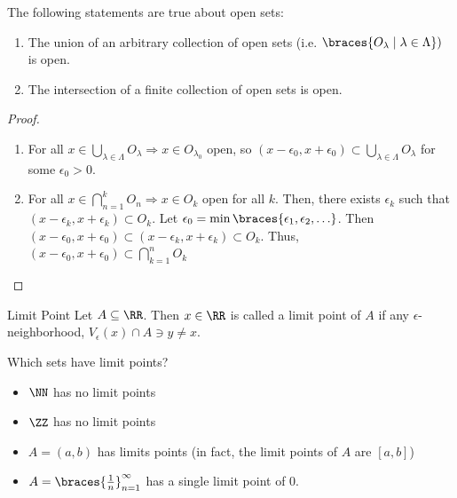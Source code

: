\begin{thm}{}{}
    The following statements are true about open sets:
    \begin{enumerate}
        \item The union of an arbitrary collection of open sets (i.e. $\braces{O_{\lambda} \mid \lambda \in \Lambda})$ is open.
        \item The intersection of a finite collection of open sets is open.
    \end{enumerate}
    \begin{proof}
        \phantom{x} 
        \begin{enumerate}
            \item For all $x \in \bigcup_{\lambda \in \Lambda} O_\lambda \Rightarrow x \in O_{\lambda_{0}}$ open, so $(x - \epsilon_0, x + \epsilon_0) \subset \bigcup_{\lambda \in \Lambda} O_\lambda$ for some $\epsilon_0 > 0$.

            \item For all $x \in \bigcap_{n=1}^{k} O_n \Rightarrow x \in O_k$ open for all $k$. Then, there exists $\epsilon_k$ such that $(x - \epsilon_k, x + \epsilon_k) \subset O_k$. Let $\epsilon_0 = \min\braces{\epsilon_1, \epsilon_2, \ldots}$. Then $(x - \epsilon_0, x + \epsilon_0) \subset (x - \epsilon_k, x + \epsilon_k) \subset O_k$. Thus, $(x - \epsilon_0, x + \epsilon_0) \subset \bigcap_{k=1}^{n} O_k$
        \end{enumerate}
    \end{proof}
\end{thm}

\begin{defbox}{Limit Point}{}
    Let $A \subseteq \RR$. Then $x \in \RR$ is called a limit point of $A$ if any $\epsilon$-neighborhood, $V_{\epsilon}(x) \cap A \ni y \neq x$.
\end{defbox}

\begin{example}{Which sets have limit points?}{}
    \begin{itemize}
        \item $\NN$ has no limit points 
        \item $\ZZ$ has no limit points 
        \item $A = (a, b)$ has limits points (in fact, the limit points of $A$ are $[a, b]$)
        \item $A = \braces{\frac{1}{n}}_{n=1}^{\infty}$ has a single limit point of $0$.
    \end{itemize}
\end{example}

